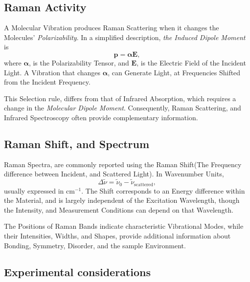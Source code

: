 \documentclass[a4paper, 10pt, onepage]{elegantbook}
\begin{document}
{\subsection{Raman Activity}

\noindent

A Molecular Vibration produces Raman Scattering when it changes the Molecules' \emph{Polarizability}. In a simplified 
description, \emph{the Induced
Dipole Moment} is  
\begin{equation}
  \mathbf{p} = \boldsymbol{\alpha}\mathbf{E},
\end{equation}
where $\boldsymbol{\alpha}$, is the Polarizability Tensor, and $\mathbf{E}$, is the 
Electric Field of the Incident Light. A Vibration that changes $\boldsymbol{\alpha}$, can Generate Light, at 
Frequencies Shifted from the Incident Frequency.  

This Selection rule, differs from that of Infrared Absorption, which requires a change in the \emph{Molecular Dipole 
Moment}. Consequently, Raman Scattering, and Infrared Spectroscopy often provide complementary information.  

\subsection{Raman Shift, and Spectrum} 

\noindent

Raman Spectra, are commonly reported using the Raman Shift(The Frequency difference between Incident, and Scattered 
Light). In Wavenumber Units,
\begin{equation}
  \Delta\tilde{\nu}
  = \tilde{\nu}_0-\tilde{\nu}_{\mathrm{scattered}},
\end{equation}
usually expressed in $\mathrm{cm}^{-1}$. The Shift corresponds to an Energy difference within the Material, and is 
largely independent of the Excitation Wavelength, though the Intensity, and Measurement Conditions can depend on that 
Wavelength.  

The Positions of Raman Bands indicate characteristic Vibrational Modes, while their Intensities, Widths, and Shapes, 
provide additional information about Bonding, Symmetry, Disorder, and the sample Environment.  

\subsection{Experimental considerations}

}
\end{document}
